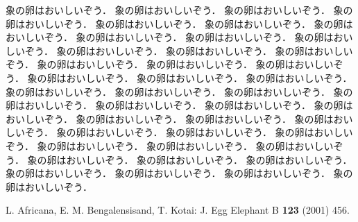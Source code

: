 \documentclass[b5paper,papersize,twocolumn]{jsarticle}
\begin{document}
象の卵はおいしいぞう．
象の卵はおいしいぞう．
象の卵はおいしいぞう．
象の卵はおいしいぞう．
象の卵はおいしいぞう．
象の卵はおいしいぞう．
象の卵はおいしいぞう．
象の卵はおいしいぞう．
象の卵はおいしいぞう．
象の卵はおいしいぞう．
象の卵はおいしいぞう．
象の卵はおいしいぞう．
象の卵はおいしいぞう．
象の卵はおいしいぞう．
象の卵はおいしいぞう．
象の卵はおいしいぞう．
象の卵はおいしいぞう．
象の卵はおいしいぞう．
象の卵はおいしいぞう．
象の卵はおいしいぞう．
象の卵はおいしいぞう．
象の卵はおいしいぞう．
象の卵はおいしいぞう．
象の卵はおいしいぞう．
象の卵はおいしいぞう．
象の卵はおいしいぞう．
象の卵はおいしいぞう．
象の卵はおいしいぞう．
象の卵はおいしいぞう．
象の卵はおいしいぞう．
象の卵はおいしいぞう．
象の卵はおいしいぞう．
象の卵はおいしいぞう．
象の卵はおいしいぞう．
象の卵はおいしいぞう．
象の卵はおいしいぞう．
象の卵はおいしいぞう．
象の卵はおいしいぞう．
象の卵はおいしいぞう．
象の卵はおいしいぞう．
象の卵はおいしいぞう．
象の卵はおいしいぞう．

\begin{thebibliography}{99}
L. Africana, E. M. Bengalensisand, T. Kotai: J. Egg Elephant B {\bf 123} (2001) 456.
\end{thebibliography}
\end{document}
